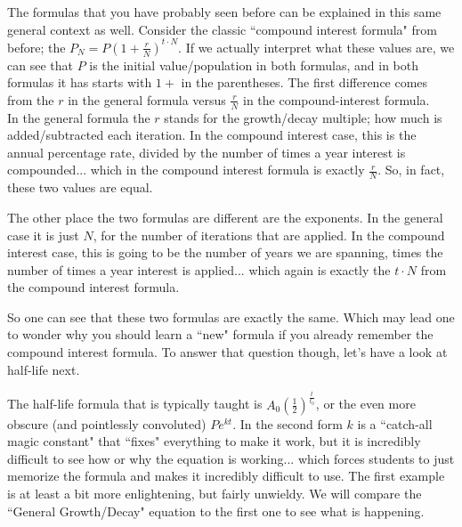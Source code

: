 \documentclass{ximeraXloud}
\begin{document}
        The formulas that you have probably seen before can be explained in this same general context as well. Consider the classic ``compound interest formula" from before; the $P_N = P\left(1 + \frac{r}{N}\right)^{t \cdot N}$. If we actually interpret what these values are, we can see that $P$ is the initial value/population in both formulas, and in both formulas it has starts with $1 +$ in the parentheses. The first difference comes from the $r$ in the general formula versus $\frac{r}{N}$ in the compound-interest formula. \\
        
        In the general formula the $r$ stands for the growth/decay multiple; how much is added/subtracted each iteration. In the compound interest case, this is the annual percentage rate, divided by the number of times a year interest is compounded... which in the compound interest formula is exactly $\frac{r}{N}$. So, in fact, these two values are equal.
        
        The other place the two formulas are different are the exponents. In the general case it is just $N$, for the number of iterations that are applied. In the compound interest case, this is going to be the number of years we are spanning, times the number of times a year interest is applied... which again is exactly the $t \cdot N$ from the compound interest formula. 
        
        So one can see that these two formulas are exactly the same. Which may lead one to wonder why you should learn a ``new" formula if you already remember the compound interest formula. To answer that question though, let's have a look at half-life next.
        
        
        The half-life formula that is typically taught is $A_0\left(\frac{1}{2}\right)^{\frac{t}{t_0}}$, or the even more obscure (and pointlessly convoluted) $Pe^{kt}$. In the second form $k$ is a ``catch-all magic constant" that ``fixes" everything to make it work, but it is incredibly difficult to see how or why the equation is working... which forces students to just memorize the formula and makes it incredibly difficult to use. The first example is at least a bit more enlightening, but fairly unwieldy. We will compare the ``General Growth/Decay" equation to the first one to see what is happening.
        
\end{document}
